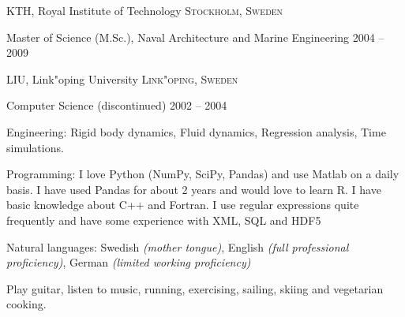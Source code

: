 \documentclass[10pt,a4paper]{article} %
\begin{document}

\headedsection %
{KTH, Royal Institute of Technology}
{\textsc{Stockholm, Sweden}} {

\headedsubsection %
{Master of Science (M.Sc.), Naval Architecture and Marine Engineering}
{2004 -- 2009}
{\bodytext{ }}
}


\headedsection %
{LIU, Link"oping University}
{\textsc{Link"oping, Sweden}} {

\headedsubsection %
{Computer Science \textnormal{(discontinued)}}
{2002 -- 2004} {}
}


\spacedhrule{0.5em}{-0.4em} %



\inlineheadsection %
{Engineering:}
{Rigid body dynamics, Fluid dynamics, Regression analysis, Time simulations.}

\inlineheadsection %
{Programming:}
{I love Python (NumPy, SciPy, Pandas) and use Matlab on a daily basis. I have used Pandas for about 2 years and would love to learn R. I have basic knowledge about C++ and Fortran. I use regular expressions quite frequently and have some experience with XML, SQL and HDF5}


\inlineheadsection %
{Natural languages:}
{Swedish \textit{(mother tongue)}, English \textit{(full professional proficiency)}, German \textit{(limited working proficiency)}}


\spacedhrule{1.6em}{-0.4em} %


Play guitar, listen to music, running, exercising, sailing, skiing and vegetarian cooking.

\end{document}
